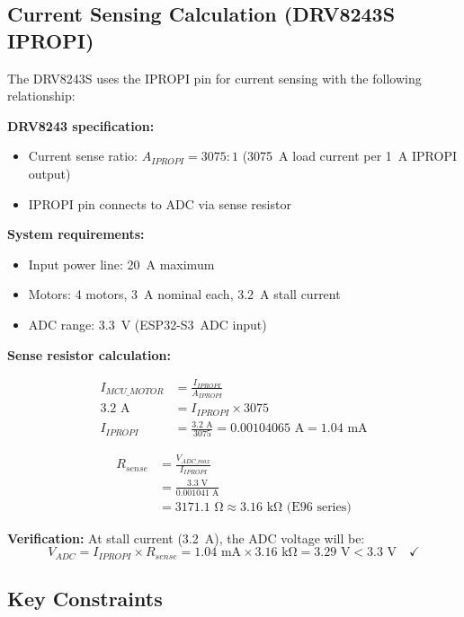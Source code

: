 \documentclass[12pt,letterpaper]{article}
\begin{document}
\subsection{Current Sensing Calculation (DRV8243S IPROPI)}

The DRV8243S uses the IPROPI pin for current sensing with the following relationship:

\textbf{DRV8243 specification:}
\begin{itemize}
    \item Current sense ratio: $A_{IPROPI} = 3075:1$ (3075~A load current per 1~A IPROPI output)
    \item IPROPI pin connects to ADC via sense resistor
\end{itemize}

\textbf{System requirements:}
\begin{itemize}
    \item Input power line: 20~A maximum
    \item Motors: 4 motors, 3~A nominal each, 3.2~A stall current
    \item ADC range: 3.3~V (ESP32-S3~ADC input)
\end{itemize}

\textbf{Sense resistor calculation:}

\begin{align}
I_{MCU\_MOTOR} &= \frac{I_{IPROPI}}{A_{IPROPI}} \\
3.2 \text{ A} &= I_{IPROPI} \times 3075 \\
I_{IPROPI} &= \frac{3.2 \text{ A}}{3075} = 0.00104065 \text{ A} = 1.04 \text{ mA}
\end{align}

\begin{align}
R_{sense} &= \frac{V_{ADC\_max}}{I_{IPROPI}} \\
          &= \frac{3.3 \text{ V}}{0.001041 \text{ A}} \\
          &= 3171.1 \text{ Ω} \approx 3.16 \text{ kΩ (E96 series)}
\end{align}

\textbf{Verification:}
At stall current (3.2~A), the ADC voltage will be:
\begin{equation}
V_{ADC} = I_{IPROPI} \times R_{sense} = 1.04 \text{ mA} \times 3.16 \text{ kΩ} = 3.29 \text{ V} < 3.3 \text{ V} \quad \checkmark
\end{equation}

\subsection{Key Constraints}
\end{document}
